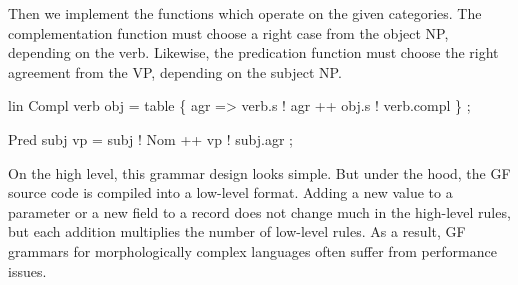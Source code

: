 \documentclass[10pt,a4paper]{article}
\newenvironment{Shaded}{\begin{snugshade}}{\end{snugshade}}
\newcommand{\DataTypeTok}[1]{\textcolor[rgb]{0.13,0.29,0.53}{{#1}}}
\newcommand{\OtherTok}[1]{\textcolor[rgb]{0.56,0.35,0.01}{{#1}}}
\newcommand{\FunctionTok}[1]{\textcolor[rgb]{0.00,0.00,0.00}{{#1}}}
\newcommand{\NormalTok}[1]{{#1}}
\begin{document}

Then we implement the functions which operate on the given categories.
The complementation function must choose a right case from the object
NP, depending on the verb. Likewise, the predication function must
choose the right agreement from the VP, depending on the subject NP.

\begin{Shaded}
\begin{Highlighting}[]
\NormalTok{lin }
  \DataTypeTok{Compl} \NormalTok{verb obj }\FunctionTok{=}
   \NormalTok{table \{ agr }\OtherTok{=>} \NormalTok{verb}\FunctionTok{.}\NormalTok{s }\FunctionTok{!} \NormalTok{agr}
               \FunctionTok{++} \NormalTok{obj}\FunctionTok{.}\NormalTok{s }\FunctionTok{!} \NormalTok{verb}\FunctionTok{.}\NormalTok{compl \} ;}

  \DataTypeTok{Pred} \NormalTok{subj vp }\FunctionTok{=} \NormalTok{subj }\FunctionTok{!} \DataTypeTok{Nom} 
              \FunctionTok{++} \NormalTok{vp }\FunctionTok{!} \NormalTok{subj}\FunctionTok{.}\NormalTok{agr ;}
\end{Highlighting}
\end{Shaded}




On the high level, this grammar design looks simple. 
But under the hood, the GF source code is compiled into a low-level
format. Adding a new value to a parameter or a new field to a record 
does not change much in the high-level rules, but each addition
multiplies the number of low-level rules. As a result, GF grammars for
morphologically complex languages often suffer from performance issues.

\end{document}
